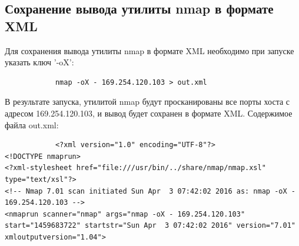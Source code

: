 \documentclass[10pt,a4paper]{report}
\begin{document}
	\subsection{Сохранение вывода утилиты nmap в формате XML}
		Для сохранения вывода утилиты nmap в формате  XML необходимо при 
		запуске указать ключ '-oX':
		\begin{verbatim}
			nmap -oX - 169.254.120.103 > out.xml
		\end{verbatim}
		В результате запуска, утилитой nmap будут просканированы все порты хоста с адресом 169.254.120.103, и вывод будет сохранен в формате 
		XML. Содержимое файла out.xml:
		\begin{verbatim}
			<?xml version="1.0" encoding="UTF-8"?>
<!DOCTYPE nmaprun>
<?xml-stylesheet href="file:///usr/bin/../share/nmap/nmap.xsl" type="text/xsl"?>
<!-- Nmap 7.01 scan initiated Sun Apr  3 07:42:02 2016 as: nmap -oX - 169.254.120.103 -->
<nmaprun scanner="nmap" args="nmap -oX - 169.254.120.103" start="1459683722" startstr="Sun Apr  3 07:42:02 2016" version="7.01" xmloutputversion="1.04">

\end{verbatim}
\end{document}
